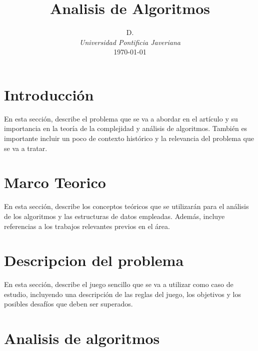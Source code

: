 \documentclass[10pt,twocolumn]{article}
\author{D.\\
	\small \textit{Universidad Pontificia Javeriana}\\
	\small \today}
\title{\textbf{Analisis de Algoritmos}}
\date{\vspace{-5ex}}
\begin{document}
	
	
	\section{Introducción}
	
	 En esta sección, describe el problema que se va a abordar en el artículo y su importancia en la teoría de la complejidad y análisis de algoritmos. También es importante incluir un poco de contexto histórico y la relevancia del problema que se va a tratar.
	
	\section{Marco Teorico}
	
	En esta sección, describe los conceptos teóricos que se utilizarán para el análisis de los algoritmos y las estructuras de datos empleadas. Además, incluye referencias a los trabajos relevantes previos en el área.
	

	
	\section{Descripcion del problema}
	
	En esta sección, describe el juego sencillo que se va a utilizar como caso de estudio, incluyendo una descripción de las reglas del juego, los objetivos y los posibles desafíos que deben ser superados.
	
	
	\section{Analisis de algoritmos}
	
\end{document}
